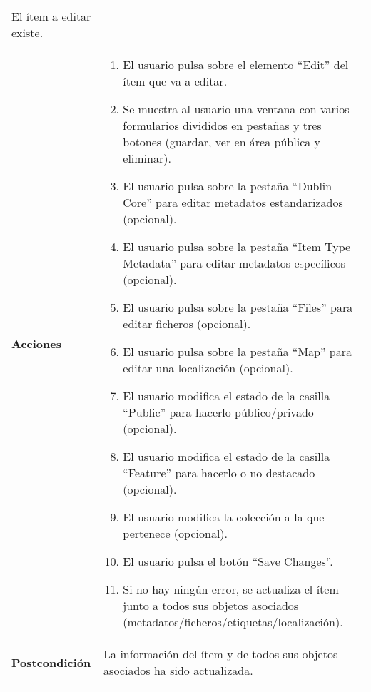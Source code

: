 \begin{longtable}[]{@{}ll@{}}
\begin{minipage}[t]{0.79\columnwidth}
El ítem a editar existe.\strut
\end{minipage}\tabularnewline
\begin{minipage}[t]{0.15\columnwidth}\raggedright
\textbf{Acciones}\strut
\end{minipage} & \begin{minipage}[t]{0.79\columnwidth}\raggedright
\begin{enumerate}
\def\labelenumi{\arabic{enumi}.}
\tightlist
\item
  El usuario pulsa sobre el elemento ``Edit'' del ítem que va a editar.
\item
  Se muestra al usuario una ventana con varios formularios divididos en
  pestañas y tres botones (guardar, ver en área pública y eliminar).
\item
  El usuario pulsa sobre la pestaña ``Dublin Core'' para editar metadatos
  estandarizados (opcional).
\item
  El usuario pulsa sobre la pestaña ``Item Type Metadata'' para editar
  metadatos específicos (opcional).
\item
  El usuario pulsa sobre la pestaña ``Files'' para editar ficheros
  (opcional).
\item
  El usuario pulsa sobre la pestaña ``Map'' para editar una localización
  (opcional).
\item
  El usuario modifica el estado de la casilla ``Public'' para hacerlo
  público/privado (opcional).
\item
  El usuario modifica el estado de la casilla ``Feature'' para hacerlo o
  no destacado (opcional).
\item
  El usuario modifica la colección a la que pertenece (opcional).
\item
  El usuario pulsa el botón ``Save Changes''.
\item
  Si no hay ningún error, se actualiza el ítem junto a todos sus objetos
  asociados (metadatos/ficheros/etiquetas/localización).
\end{enumerate}\strut
\end{minipage}\tabularnewline
\begin{minipage}[t]{0.15\columnwidth}\raggedright
\textbf{Postcondición}\strut
\end{minipage} & \begin{minipage}[t]{0.79\columnwidth}\raggedright
La información del ítem y de todos sus objetos asociados ha sido
actualizada.\strut
\end{minipage}\tabularnewline
\begin{minipage}[t]{0.15\columnwidth}\raggedright

\end{minipage}
\end{longtable}
